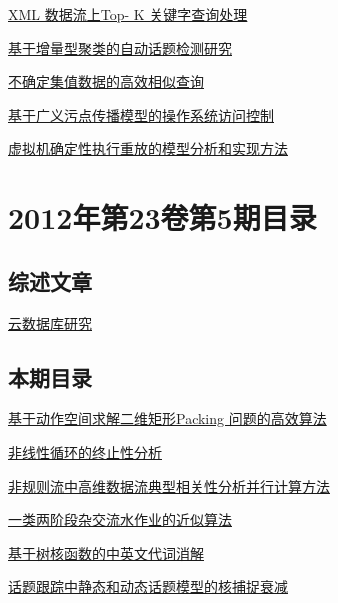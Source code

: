 \documentclass[a4paper]{article}
\begin{document}
\href{http://www.jos.org.cn/ch/reader/download_pdf.aspx?file_no=4114&year_id=2012&quarter_id=6&falg=1}{XML 数据流上Top- K 关键字查询处理}

\href{http://www.jos.org.cn/ch/reader/download_pdf.aspx?file_no=4111&year_id=2012&quarter_id=6&falg=1}{基于增量型聚类的自动话题检测研究}

\href{http://www.jos.org.cn/ch/reader/download_pdf.aspx?file_no=4110&year_id=2012&quarter_id=6&falg=1}{不确定集值数据的高效相似查询}

\href{http://www.jos.org.cn/ch/reader/download_pdf.aspx?file_no=4083&year_id=2012&quarter_id=6&falg=1}{基于广义污点传播模型的操作系统访问控制}

\href{http://www.jos.org.cn/ch/reader/download_pdf.aspx?file_no=4118&year_id=2012&quarter_id=6&falg=1}{虚拟机确定性执行重放的模型分析和实现方法}


\section{\textbf{2012年第23卷第5期目录}}
\subsection{综述文章}
\href{http://www.jos.org.cn/ch/reader/download_pdf.aspx?file_no=4195&year_id=2012&quarter_id=5&falg=1}{云数据库研究}

\subsection{本期目录}
\href{http://www.jos.org.cn/ch/reader/download_pdf.aspx?file_no=3986&year_id=2012&quarter_id=5&falg=1}{基于动作空间求解二维矩形Packing 问题的高效算法}

\href{http://www.jos.org.cn/ch/reader/download_pdf.aspx?file_no=3982&year_id=2012&quarter_id=5&falg=1}{非线性循环的终止性分析}

\href{http://www.jos.org.cn/ch/reader/download_pdf.aspx?file_no=4008&year_id=2012&quarter_id=5&falg=1}{非规则流中高维数据流典型相关性分析并行计算方法}

\href{http://www.jos.org.cn/ch/reader/download_pdf.aspx?file_no=0587&year_id=2012&quarter_id=5&falg=1}{一类两阶段杂交流水作业的近似算法}

\href{http://www.jos.org.cn/ch/reader/download_pdf.aspx?file_no=4044&year_id=2012&quarter_id=5&falg=1}{基于树核函数的中英文代词消解}

\href{http://www.jos.org.cn/ch/reader/download_pdf.aspx?file_no=4045&year_id=2012&quarter_id=5&falg=1}{话题跟踪中静态和动态话题模型的核捕捉衰减}
\end{document}
